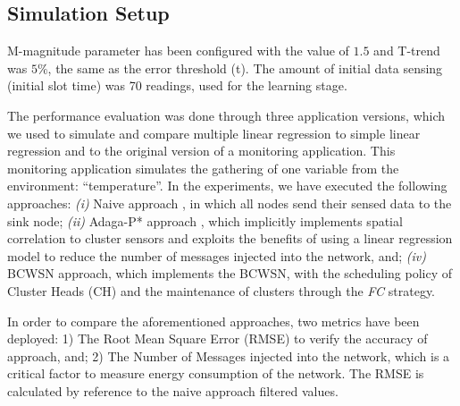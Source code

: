 \documentclass{acm_proc_article-sp}
\begin{document}
\subsection{Simulation Setup}
\label{data-and-experiments}

M-magnitude parameter has been configured with the value of $1.5$ and T-trend
was $5\%$, the same as the error threshold (t). The amount of initial data sensing
(initial slot time) was 70 readings, used for the learning stage.

The performance evaluation was done through three application versions, which we
used to simulate and compare multiple linear regression to simple linear
regression and to the original version of a monitoring application. This
monitoring application simulates the gathering of one variable from the
environment: ``temperature''.
In the experiments, we have executed the following approaches: {\it
  (i)} Naive approach \cite{Madden2005}, in which all nodes send their sensed
data to the sink node;  {\it
  (ii)} Adaga-P* approach \cite{MaiaSAC2013, MaiaACR2013}, which
implicitly implements spatial correlation to cluster sensors and exploits the
benefits of using a linear regression model to reduce the number of messages
injected into the network, and;  {\it 
  (iv)} BCWSN approach, which implements the BCWSN, with the scheduling
policy of Cluster Heads (CH) and the maintenance of clusters through the
\textit{FC} strategy.

In order to compare the aforementioned approaches, two metrics have been
deployed: 1) The Root Mean Square Error (RMSE) to verify the accuracy of
approach, and; 2) The Number of Messages injected into the network, which is a
critical factor to measure energy consumption of the network. The RMSE is
calculated by reference to the naive approach filtered values.

\end{document}
